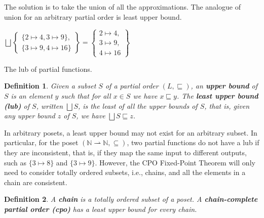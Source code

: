 \documentclass{tufte-handout}
\newcommand{\pto}[0]{\rightharpoonup}
\newtheorem{definition}{Definition}%
\begin{document}
The solution is to take the union of all the approximations. The
analogue of union for an arbitrary partial order is least upper bound.

\begin{marginfigure}
$\bigsqcup \left\{\!\! \begin{array}{l}
              \{ 2 \mapsto 4, 3 \mapsto 9 \}, \\
              \{ 3 \mapsto 9, 4 \mapsto 16 \} 
                 \end{array}\!\! \right\}
= \left\{\!\! \begin{array}{l}
        2 \mapsto 4, \\ 3 \mapsto 9, \\ 4 \mapsto 16 
    \end{array}\!\! \right\}$
\caption{The lub of partial functions.}
\end{marginfigure}

\begin{definition}
Given a subset $S$ of a partial order $(L,\sqsubseteq)$, an
\textbf{\emph{upper bound}} of $S$ is an element $y$ such that for all
$x \in S$ we have $x \sqsubseteq y$.  The \textbf{\emph{least upper
    bound (lub)}} of $S$, written $\bigsqcup S$, is the least of all
the upper bounds of $S$, that is, given any upper bound $z$ of $S$, we
have $\bigsqcup S \sqsubseteq z$.
\end{definition}

In arbitrary posets, a least upper bound may not exist for an
arbitrary subset. In particular, for the poset
$(\mathbb{N}{\pto}\mathbb{N}, \subseteq)$, two partial
functions do not have a lub if they are inconsistent, that is, if they
map the same input to different outputs, such as $\{3\mapsto 8\}$ and
$\{3 \mapsto 9\}$. However, the CPO Fixed-Point Theorem will only need to
consider totally ordered subsets, i.e., chains, and all the elements
in a chain are consistent.

\begin{definition}
  A \textbf{\emph{chain}} is a totally ordered subset of a poset.  A
  \textbf{\emph{chain-complete partial order (cpo)}} has a least upper
  bound for every chain.
\end{definition}


\end{document}
